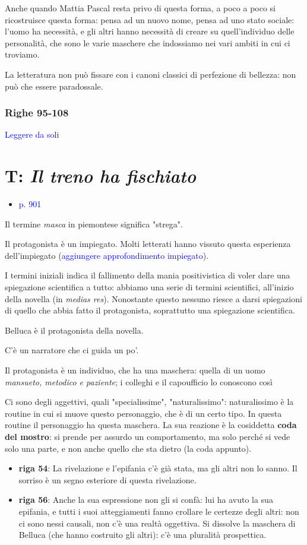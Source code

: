 \documentclass[a4paper, twoside, titlepage]{book}
\newcommand{\elenco}[1]{%
\begin{itemize}
#1
\end{itemize}}
\renewcommand{\emph}[1]{\textcolor{blue}{#1}}
\begin{document}
Anche quando Mattia Pascal resta privo di questa forma, a poco a poco si ricostruisce questa forma: pensa ad un nuovo nome, pensa ad uno stato sociale: l'uomo ha necessità, e gli altri hanno necessità di creare su quell'individuo delle personalità, che sono le varie maschere che indossiamo nei vari ambiti in cui ci troviamo.

La letteratura non può fissare con i canoni classici di perfezione di bellezza: non può che essere paradossale.

\subsection*{Righe 95-108}

\emph{Leggere da soli}


\chapter{T: \textit{Il treno ha fischiato}}
\elenco{\item \emph{p. 901}}

Il termine \textit{masca} in piemontese significa "strega".

Il protagonista è un impiegato. Molti letterati hanno vissuto questa esperienza dell'impiegato (\emph{aggiungere approfondimento impiegato}).

I termini iniziali indica il fallimento della mania positivistica di voler dare una spiegazione scientifica a tutto: abbiamo una serie di termini scientifici, all'inizio della novella (in \textit{medias res}).
Nonostante questo nessuno riesce a darsi spiegazioni di quello che abbia fatto il protagonista, soprattutto una spiegazione scientifica.

Belluca è il protagonista della novella.

C'è un narratore che ci guida un po'.

Il protagonista è un individuo, che ha una maschera: quella di un uomo \textit{mansueto, metodico e paziente}; i colleghi e il capoufficio lo conoscono così

Ci sono degli aggettivi, quali "specialissime", "naturalissimo": naturalissimo è la routine in cui si muove questo personaggio, che è di un certo tipo. In questa routine il personaggio ha questa maschera. La sua reazione è la cosiddetta \textbf{coda del mostro}: si prende per assurdo un comportamento, ma solo perché si vede solo una parte, e non anche quello che sta dietro (la coda appunto).

\elenco{\item \textbf{riga 54}: La rivelazione e l'epifania c'è già stata, ma gli altri non lo sanno. Il sorriso è un segno esteriore di questa rivelazione.
\item \textbf{riga 56}: Anche la sua espressione non gli si confà: lui ha avuto la sua epifania, e tutti i suoi atteggiamenti fanno crollare le certezze degli altri: non ci sono nessi causali, non c'è una realtà oggettiva. Si dissolve la maschera di Belluca (che hanno costruito gli altri): c'è una pluralità prospettica.
}
\end{document}
